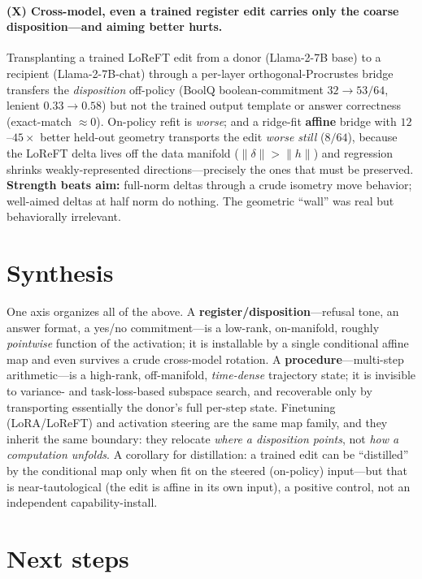 \documentclass{article}
\begin{document}
\paragraph{(X) Cross-model, even a trained register edit carries only the coarse disposition---and
aiming better hurts.}
Transplanting a trained LoReFT edit from a donor (Llama-2-7B base) to a recipient (Llama-2-7B-chat)
through a per-layer orthogonal-Procrustes bridge transfers the \emph{disposition} off-policy (BoolQ
boolean-commitment $32 \to 53/64$, lenient $0.33 \to 0.58$) but not the trained output template or
answer correctness (exact-match $\approx 0$). On-policy refit is \emph{worse}; and a ridge-fit
\textbf{affine} bridge with $12$--$45\times$ better held-out geometry transports the edit \emph{worse
still} ($8/64$), because the LoReFT delta lives off the data manifold ($\lVert\delta\rVert >
\lVert h \rVert$) and regression shrinks weakly-represented directions---precisely the ones that must
be preserved. \textbf{Strength beats aim:} full-norm deltas through a crude isometry move behavior;
well-aimed deltas at half norm do nothing. The geometric ``wall'' was real but behaviorally irrelevant.

\section{Synthesis}

One axis organizes all of the above. A \textbf{register/disposition}---refusal tone, an answer format,
a yes/no commitment---is a low-rank, on-manifold, roughly \emph{pointwise} function of the activation;
it is installable by a single conditional affine map and even survives a crude cross-model rotation. A
\textbf{procedure}---multi-step arithmetic---is a high-rank, off-manifold, \emph{time-dense} trajectory
state; it is invisible to variance- and task-loss-based subspace search, and recoverable only by
transporting essentially the donor's full per-step state. Finetuning (LoRA/LoReFT) and activation
steering are the same map family, and they inherit the same boundary: they relocate \emph{where a
disposition points}, not \emph{how a computation unfolds}. A corollary for distillation: a trained edit
can be ``distilled'' by the conditional map only when fit on the steered (on-policy) input---but that
is near-tautological (the edit is affine in its own input), a positive control, not an independent
capability-install.

\section{Next steps}
\end{document}
